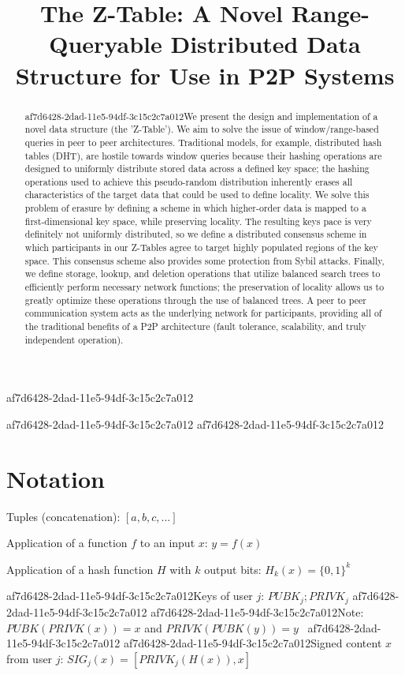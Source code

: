 \documentclass[12pt]{article}
\title{The Z-Table: A Novel Range-Queryable Distributed Data Structure for Use in P2P Systems}
\begin{document}
af7d6428-2dad-11e5-94df-3c15c2c7a012\maketitle
af7d6428-2dad-11e5-94df-3c15c2c7a012
af7d6428-2dad-11e5-94df-3c15c2c7a012\begin{abstract}
af7d6428-2dad-11e5-94df-3c15c2c7a012We present the design and implementation of a novel data structure (the 'Z-Table'). We aim to solve the issue of window/range-based queries in peer to peer architectures. Traditional models, for example,  distributed hash tables (DHT), are hostile towards window queries because their hashing operations are designed to uniformly distribute stored data across a defined key space; the hashing operations used to achieve this pseudo-random distribution inherently erases all characteristics of the target data that could be used to define locality. We solve this problem of erasure by defining a scheme in which higher-order data is mapped to a first-dimensional key space, while preserving locality. The resulting keys pace is very definitely not uniformly distributed, so we define a distributed consensus scheme in which participants in our Z-Tables agree to target highly populated regions of the key space. This consensus scheme also provides some protection from Sybil attacks. Finally, we define storage, lookup, and deletion operations that utilize balanced search trees to efficiently perform necessary network functions; the preservation of locality allows us to greatly optimize these operations through the use of balanced trees. A peer to peer communication system acts as the underlying network for participants, providing all of the traditional benefits of a P2P architecture (fault tolerance, scalability, and truly independent operation).
\end{abstract}

\section{Notation}

Tuples (concatenation): $[a,b,c,...]$

Application of a function $f$ to an input $x$: $y=f(x)$

Application of a hash function $H$ with $k$ output bits: $H_{k}(x) = \{0,1\}^k$

af7d6428-2dad-11e5-94df-3c15c2c7a012Keys of user $j$: $ PUBK_j; PRIVK_j $
af7d6428-2dad-11e5-94df-3c15c2c7a012
af7d6428-2dad-11e5-94df-3c15c2c7a012Note: $PUBK(PRIVK(x)) = x$ and $PRIVK(PUBK(y)) = y$~
af7d6428-2dad-11e5-94df-3c15c2c7a012
af7d6428-2dad-11e5-94df-3c15c2c7a012Signed content $x$ from user $j$: $SIG_j(x) = \left[ PRIVK_j( H(x) ), x \right]$
\end{document}
